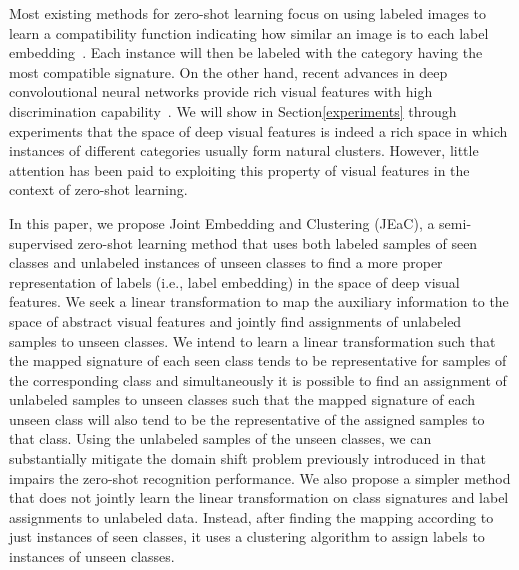 \documentclass[10pt,twocolumn,letterpaper]{article}
\begin{document}
Most existing methods for zero-shot learning focus on using labeled images to learn a compatibility function indicating how similar an image is
to each label embedding~\cite{Akata2015,emb15,sse}. Each instance will then be labeled with the category having the most compatible signature.
 On the other hand, recent advances in deep convoloutional neural networks provide rich visual features with high discrimination capability~\cite{vgg}.
  We will show in Section\ref{experiments} through experiments that the space of deep visual features is indeed a rich space in which instances of different categories usually form natural clusters. However, little attention has been paid to exploiting this property of visual features in the context of zero-shot learning.


In this paper, we propose Joint Embedding and Clustering (JEaC),
a semi-supervised zero-shot learning method that uses both labeled samples of seen classes and unlabeled instances
 of unseen classes to find a more proper representation of labels (i.e., label embedding) in the space of deep visual features.
  We seek a linear transformation to map the auxiliary information to the space of abstract
   visual features and jointly find assignments of unlabeled samples to unseen classes.
We intend to learn a linear transformation such that the mapped signature of each seen class tends to be representative
 for samples of the corresponding class and simultaneously
it is possible to find an assignment of unlabeled samples to unseen classes such that the mapped signature of each unseen class
will also tend to be the representative of the assigned samples to that class.
Using the unlabeled samples of the unseen classes, we can substantially mitigate the domain shift problem previously introduced in \cite{eccv14} that impairs the zero-shot recognition performance.
We also propose a simpler method that does not jointly learn the linear transformation on class signatures and label assignments to unlabeled data.
Instead, after finding the mapping according to just instances of seen classes, it uses a clustering algorithm to assign labels to instances of unseen classes. %
\end{document}
